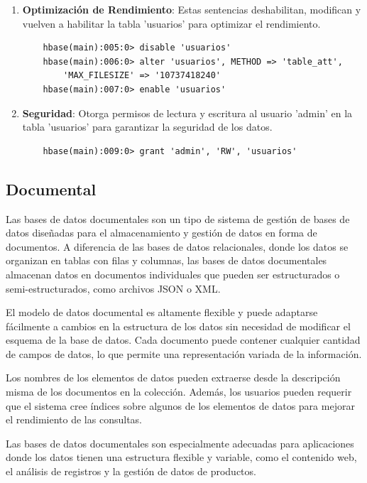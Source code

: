 \documentclass[pdflatex,sn-mathphys-num]{sn-jnl}
\theoremstyle{thmstyleone}%
\theoremstyle{thmstyletwo}%
\theoremstyle{thmstylethree}%
\begin{document}
\begin{enumerate}
    \item \textbf{Optimización de Rendimiento}: Estas sentencias deshabilitan, modifican y vuelven a habilitar la tabla 'usuarios' para optimizar el rendimiento.
    \begin{verbatim}
    hbase(main):005:0> disable 'usuarios'
    hbase(main):006:0> alter 'usuarios', METHOD => 'table_att', 
        'MAX_FILESIZE' => '10737418240'
    hbase(main):007:0> enable 'usuarios'
    \end{verbatim}

    \vspace{-0.25cm}
    
    \item \textbf{Seguridad}: Otorga permisos de lectura y escritura al usuario 'admin' en la tabla 'usuarios' para garantizar la seguridad de los datos.
    \begin{verbatim}
    hbase(main):009:0> grant 'admin', 'RW', 'usuarios'
    \end{verbatim}
\end{enumerate}

\vspace{-0.7cm}

\subsection{Documental}\label{sec43}

Las bases de datos documentales son un tipo de sistema de gestión de bases de datos diseñadas para el almacenamiento y gestión de datos en forma de documentos. A diferencia de las bases de datos relacionales, donde los datos se organizan en tablas con filas y columnas, las bases de datos documentales almacenan datos en documentos individuales que pueden ser estructurados o semi-estructurados, como archivos JSON o XML.

El modelo de datos documental es altamente flexible y puede adaptarse fácilmente a cambios en la estructura de los datos sin necesidad de modificar el esquema de la base de datos. Cada documento puede contener cualquier cantidad de campos de datos, lo que permite una representación variada de la información.

Los nombres de los elementos de datos pueden extraerse desde la descripción misma de los documentos en la colección. Además, los usuarios pueden requerir que el sistema cree índices sobre algunos de los elementos de datos para mejorar el rendimiento de las consultas.

Las bases de datos documentales son especialmente adecuadas para aplicaciones donde los datos tienen una estructura flexible y variable, como el contenido web, el análisis de registros y la gestión de datos de productos.
\end{document}
